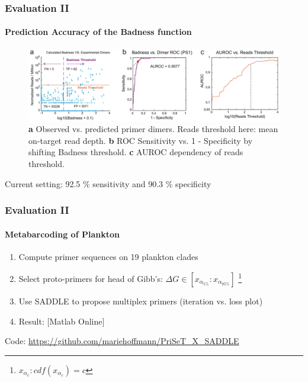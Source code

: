 \documentclass[xcolor=dvipsnames,envcountsect]{beamer}
\begin{document}
\begin{frame}
	\frametitle{Evaluation II}\framesubtitle{Prediction Accuracy of the Badness function}
	\begin{figure}
    \includegraphics[width=\textwidth]{fig4_top_paper}
    \caption{{\bf a} Observed vs. predicted primer dimers. Reads threshold here: mean on-target read depth. {\bf b} ROC Sensitivity vs. 1 - Specificity by shifting Badness threshold. \textbf{c} AUROC dependency of reads threshold.}
\end{figure}
Current setting: 92.5 \% sensitivity and 90.3 \% specificity
\end{frame}

\begin{frame}
	\frametitle{Evaluation II}\framesubtitle{Metabarcoding of Plankton}
    \begin{enumerate}
        \item Compute primer sequences on 19 plankton clades \cite{PriSeT2021}
        \item Select proto-primers for head of Gibb's: $\Delta G \in [x_{\alpha_{5\%}}:x_{\alpha_{95\%}}]$ \footnote{$x_{\alpha_c}: cdf(x_{\alpha_c}) = c$} %
        \item Use SADDLE to propose multiplex primers (iteration vs. loss plot)
        
        \item Result: [Matlab Online]
    \end{enumerate}
	
\vspace*{\fill}
Code: \url{https://github.com/mariehoffmann/PriSeT_X_SADDLE}
\end{frame}
\end{document}
